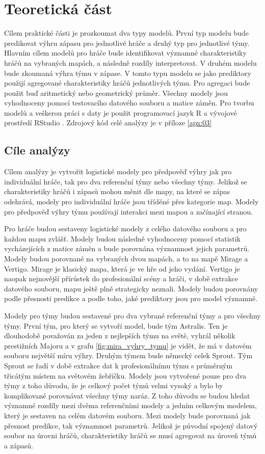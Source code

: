 \chapter{Teoretická část}
Cílem praktické části je prozkoumat dva typy modelů. První typ modelu bude predikovat výhru zápasu pro jednotlivé hráče a druhý typ pro jednotlivé týmy. Hlavním cílem 
modelů pro hráče bude identifikovat významné charakteristiky hráčů na vybraných mapách, a následně rozdíly interpretovat. V druhém modelu bude zkoumaná výhra týmu v zápase.
V tomto typu modelu se jako prediktory použijí agregované charakteristiky hráčů jednotlivých týmu. Pro agregaci bude použit buď aritmetický nebo geometrický průměr. Všechny
modely jsou vyhodnoceny pomocí testovacího datového souboru a matice záměn. Pro tvorbu modelů a veškerou práci s daty je použit programovací jazyk R \cite{team_r_2022}
a vývojové prostředí RStudio \cite{rstudio_rstudio_2022}. Zdrojový kód celé analýzy je v příloze \ref{apx:03}

\section{Cíle analýzy}
Cílem analýzy je vytvořit logistické modely pro předpověď výhry jak pro individuální hráče, tak pro dva referenční týmy nebo všechny týmy. Jelikož se charakteristiky hráčů i 
zápasů mohou měnit dle mapy, na které se zápas odehrává, modely pro individuální hráče jsou tříděné přes kategorie map. Modely pro předpověď výhry týmu používají interakci
mezi mapou a začínající
stranou.

Pro hráče budou sestaveny logistické modely z celého datového souboru a pro každou mapu zvlášť. Modely budou následně vyhodnoceny pomocí statistik vycházejících
z matice záměn a bude porovnána významnost jejich parametrů. Modely budou porovnané na vybraných dvou mapách, a to na mapě Mirage a Vertigo. Mirage je klasický mapa, která je
ve hře od jeho vydání. Vertigo je naopak nejnovější přírůstek do profesionální scény a hráči, v době extrakce datového souboru, mapu ještě plně strategicky 
neznali. Modely budou porovnány podle přesnosti predikce a podle toho, jaké prediktory jsou pro model významné.

Modely pro týmy budou sestavené pro dva vybrané referenční týmy a pro všechny týmy. První tým, pro který se vytvoří model, bude tým Astralis.
Ten je dlouhodobě považován za jeden z nejlepších týmu na světě, vyhrál několik prestižních Majoru a v grafu \ref{fig:mira_vyhry_tymu} je vidět, že má v datovém souboru
největší míru výhry. Druhým týmem bude německý celek Sprout. Tým Sprout se řadí v době extrakce dat k profesionálnímu týmu s průměrným třicátým místem na světovém žebříčku.
Modely jsou vytvořené pouze pro dva týmy z toho důvodu, že je celkový počet týmů velmi vysoký a bylo by komplikované porovnávat všechny týmy naráz. Z toho důvodu se budou
hledat významné rozdíly mezi dvěma referenčními modely a jedním celkovým modelem, který je sestaven na celém datovém souboru. Mezi modely bude porovnaná jak přesnost predikce,
tak významnost parametrů. Jelikož je původní spojený datový soubor na úrovni hráčů, charakteristiky hráčů se musí agregovat na úroveň týmů a zápasů.

